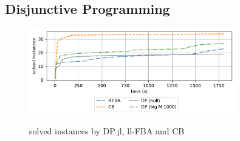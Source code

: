 \subsection{Disjunctive Programming}

\begin{figure}[h!]
    \caption{solved instances by DP.jl, ll-FBA and CB}
    \centering
    \includegraphics[width=0.8\textwidth]{Images/comparison_dp.pdf}
    \label{fig:}
\end{figure}


